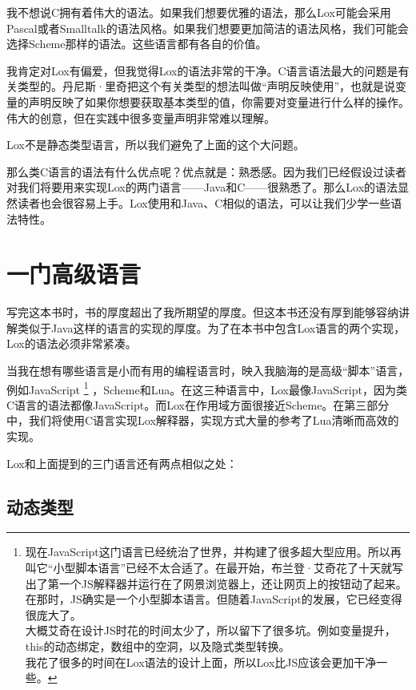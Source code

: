 \documentclass[cn,10pt,math=newtx,citestyle=gb7714-2015,bibstyle=gb7714-2015]{elegantbook}
\begin{document}
我不想说C拥有着伟大的语法。如果我们想要优雅的语法，那么Lox可能会采用Pascal或者Smalltalk的语法风格。如果我们想要更加简洁的语法风格，我们可能会选择Scheme那样的语法。这些语言都有各自的价值。

\begin{tcolorbox}
我肯定对Lox有偏爱，但我觉得Lox的语法非常的干净。C语言语法最大的问题是有关类型的。丹尼斯·里奇把这个有关类型的想法叫做“声明反映使用”，也就是说变量的声明反映了如果你想要获取基本类型的值，你需要对变量进行什么样的操作。伟大的创意，但在实践中很多变量声明非常难以理解。

Lox不是静态类型语言，所以我们避免了上面的这个大问题。
\end{tcolorbox}

那么类C语言的语法有什么优点呢？优点就是：熟悉感。因为我们已经假设过读者对我们将要用来实现Lox的两门语言——Java和C——很熟悉了。那么Lox的语法显然读者也会很容易上手。Lox使用和Java、C相似的语法，可以让我们少学一些语法特性。

\section{一门高级语言}

写完这本书时，书的厚度超出了我所期望的厚度。但这本书还没有厚到能够容纳讲解类似于Java这样的语言的实现的厚度。为了在本书中包含Lox语言的两个实现，Lox的语法必须非常紧凑。

当我在想有哪些语言是小而有用的编程语言时，映入我脑海的是高级“脚本”语言，例如JavaScript \footnote{现在JavaScript这门语言已经统治了世界，并构建了很多超大型应用。所以再叫它“小型脚本语言”已经不太合适了。在最开始，布兰登·艾奇花了十天就写出了第一个JS解释器并运行在了网景浏览器上，还让网页上的按钮动了起来。在那时，JS确实是一个小型脚本语言。但随着JavaScript的发展，它已经变得很庞大了。 \\ 大概艾奇在设计JS时花的时间太少了，所以留下了很多坑。例如变量提升，this的动态绑定，数组中的空洞，以及隐式类型转换。 \\ 我花了很多的时间在Lox语法的设计上面，所以Lox比JS应该会更加干净一些。} ，Scheme和Lua。在这三种语言中，Lox最像JavaScript，因为类C语言的语法都像JavaScript。而Lox在作用域方面很接近Scheme。在第三部分中，我们将使用C语言实现Lox解释器，实现方式大量的参考了Lua清晰而高效的实现。

Lox和上面提到的三门语言还有两点相似之处：

\subsection{动态类型}
\end{document}
